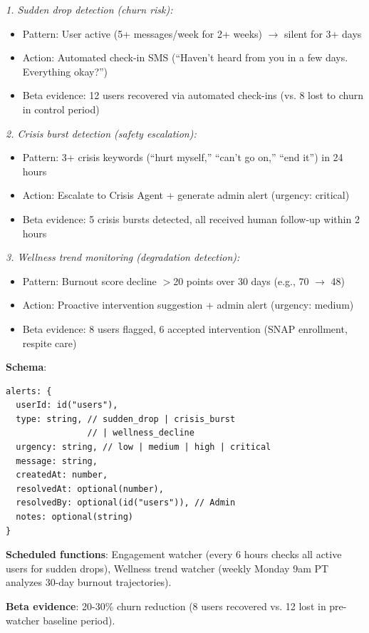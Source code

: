 \documentclass{article}%
\begin{document}
\textit{1. Sudden drop detection (churn risk):}
\begin{itemize}
    \item Pattern: User active (5+ messages/week for 2+ weeks) $\rightarrow$ silent for 3+ days
    \item Action: Automated check-in SMS (``Haven't heard from you in a few days. Everything okay?'')
    \item Beta evidence: 12 users recovered via automated check-ins (vs. 8 lost to churn in control period)
\end{itemize}

\textit{2. Crisis burst detection (safety escalation):}
\begin{itemize}
    \item Pattern: 3+ crisis keywords (``hurt myself,'' ``can't go on,'' ``end it'') in 24 hours
    \item Action: Escalate to Crisis Agent + generate admin alert (urgency: critical)
    \item Beta evidence: 5 crisis bursts detected, all received human follow-up within 2 hours
\end{itemize}

\textit{3. Wellness trend monitoring (degradation detection):}
\begin{itemize}
    \item Pattern: Burnout score decline $>$20 points over 30 days (e.g., 70 $\rightarrow$ 48)
    \item Action: Proactive intervention suggestion + admin alert (urgency: medium)
    \item Beta evidence: 8 users flagged, 6 accepted intervention (SNAP enrollment, respite care)
\end{itemize}

\textbf{Schema}:
\begin{verbatim}
alerts: {
  userId: id("users"),
  type: string, // sudden_drop | crisis_burst
                // | wellness_decline
  urgency: string, // low | medium | high | critical
  message: string,
  createdAt: number,
  resolvedAt: optional(number),
  resolvedBy: optional(id("users")), // Admin
  notes: optional(string)
}
\end{verbatim}

\textbf{Scheduled functions}: Engagement watcher (every 6 hours checks all active users for sudden drops), Wellness trend watcher (weekly Monday 9am PT analyzes 30-day burnout trajectories).

\textbf{Beta evidence}: 20-30\% churn reduction (8 users recovered vs. 12 lost in pre-watcher baseline period).
\end{document}
